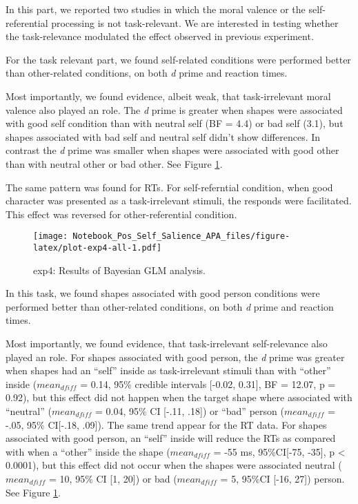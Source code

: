 \documentclass[
  english,
  man]{apa6}
\begin{document}
In this part, we reported two studies in which the moral valence or the self-referential processing is not task-relevant. We are interested in testing whether the task-relevance modulated the effect observed in previous experiment.

For the task relevant part, we found self-related conditions were performed better than other-related conditions, on both \emph{d} prime and reaction times.

Most importantly, we found evidence, albeit weak, that task-irrelevant moral valence also played an role. The \emph{d} prime is greater when shapes were associated with good self condition than with neutral self (BF = 4.4) or bad self (3.1), but shapes associated with bad self and neutral self didn't show differences. In contrast the \emph{d} prime was smaller when shapes were associated with good other than with neutral other or bad other. See Figure \ref{fig:plot-exp4-all}.

The same pattern was found for RTs. For self-referntial condition, when good character was presented as a task-irrelevant stimuli, the responds were facilitated. This effect was reversed for other-referential condition.

\begin{figure}
\centering
\texttt{[image: Notebook\_Pos\_Self\_Salience\_APA\_files/figure-latex/plot-exp4-all-1.pdf]}
\caption{\label{fig:plot-exp4-all}exp4: Results of Bayesian GLM analysis.}
\end{figure}

In this task, we found shapes associated with good person conditions were performed better than other-related conditions, on both \emph{d} prime and reaction times.

Most importantly, we found evidence, that task-irrelevant self-relevance also played an role. For shapes associated with good person, the \emph{d} prime was greater when shapes had an ``self'' inside as task-irrelevant stimuli than with ``other'' inside (\(mean_{dfiff}\) = 0.14, 95\% credible intervals {[}-0.02, 0.31{]}, BF = 12.07, p = 0.92), but this effect did not happen when the target shape where associated with ``neutral'' (\(mean_{dfiff}\) = 0.04, 95\% CI {[}-.11, .18{]}) or ``bad'' person (\(mean_{dfiff}\) = -.05, 95\% CI{[}-.18, .09{]}). The same trend appear for the RT data. For shapes associated with good person, an ``self'' inside will reduce the RTs as compared with when a ``other'' inside the shape (\(mean_{dfiff}\) = -55 ms, 95\%CI{[}-75, -35{]}, p \textless{} 0.0001), but this effect did not occur when the shapes were associated neutral (\(mean_{dfiff}\) = 10, 95\% CI {[}1, 20{]}) or bad (\(mean_{dfiff}\) = 5, 95\%CI {[}-16, 27{]}) person. See Figure \ref{fig:plot-exp4-all}.
\end{document}
